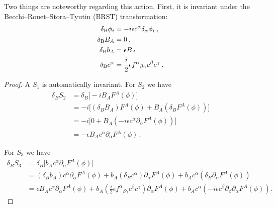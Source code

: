 Two things are noteworthy regarding this action. First, it is invariant under the Becchi–Rouet–Stora–Tyutin (BRST) transformation:
\begin{subequations}\label{4.2.6}
	\begin{align}
		\delta_{\mathrm{B}} \phi_{i}&=-i \epsilon c^{\alpha} \delta_{\alpha} \phi_{i} \:, \label{4.2.6a} \\
		\delta_{\mathrm{B}} B_{A} &=0 \:, \label{4.2.6b} \\
		\delta_{\mathrm{B}} b_{A} &=\epsilon B_{A} \label{4.2.6c} \\
		\delta_{\mathrm{B}} c^{\alpha}&=\frac{i}{2} \epsilon f^{\alpha}{}_{\beta \gamma}c^{\beta} c^{\gamma} \:. \label{4.2.6d} 
	\end{align}
\end{subequations}
\begin{tcolorbox}[breakable]
	\begin{proof}
		A $S_1$ is automatically invariant. For $S_2$ we have
		\begin{align}
			\delta_B S_2 
			&= \delta_B \bigl[ -i B_A F^A(\phi) \bigr] \\
			&= -i \bigl[ (\delta_B B_A) F^A(\phi) + B_A (\delta_B F^A(\phi)) \bigr] \\
			&= -i \bigl[ 0 + B_A (-i \epsilon c^\alpha \partial_\alpha F^A(\phi)) \bigr] \\
			&= - \epsilon B_A c^\alpha \partial_\alpha F^A(\phi) \, .
		\end{align}
		
		For $S_3$ we have
		\begin{align}
			\delta_B S_3 
			&= \delta_B \bigl[ b_A c^\alpha \partial_\alpha F^A(\phi) \bigr] \\
			&= (\delta_B b_A) c^\alpha \partial_\alpha F^A(\phi)
			+ b_A (\delta_B c^\alpha) \partial_\alpha F^A(\phi)
			+ b_A c^\alpha (\delta_B \partial_\alpha F^A(\phi)) \\
			&= \epsilon B_A c^\alpha \partial_\alpha F^A(\phi)
			+ b_A \left( \frac{i}{2} \epsilon f^{\alpha}{}_{\beta\gamma} c^\beta c^\gamma \right) \partial_\alpha F^A(\phi)
			+ b_A c^\alpha \left( -i \epsilon c^\beta \partial_\beta \partial_\alpha F^A(\phi) \right) .
		\end{align}
		

\end{proof}
\end{tcolorbox}
